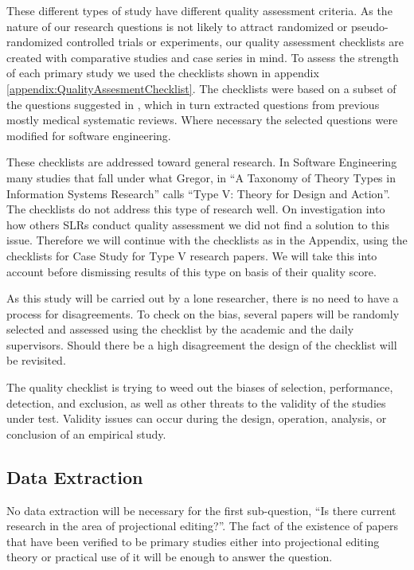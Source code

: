 These different types of study have different quality assessment criteria.  
As the nature of our research questions is not likely to attract randomized or pseudo-randomized controlled trials or experiments, our quality assessment checklists are created with comparative studies and case series in mind.
To assess the strength of each primary study we used the checklists shown in appendix \ref{appendix:QualityAssesmentChecklist}.
The checklists were based on a subset of the questions suggested in \cite{keele2007guidelines}, which in turn extracted questions from previous mostly medical systematic reviews.
Where necessary the selected questions were modified for software engineering.

These checklists are addressed toward general research.
In Software Engineering many studies that fall under what Gregor\cite{gregor2006nature}, in ``A Taxonomy of Theory Types in Information Systems Research'' calls ``Type V: Theory for Design and Action''.
The checklists do not address this type of research well.
On investigation into how others SLRs conduct quality assessment we did not find a solution to this issue. 
Therefore we will continue with the checklists as in the Appendix, using the checklists for Case Study for Type V research papers.
We will take this into account before dismissing results of this type on basis of their quality score.

As this study will be carried out by a lone researcher, there is no need to have a process for disagreements.
To check on the bias, several papers will be randomly selected and assessed using the checklist by the academic and the daily supervisors.
Should there be a high disagreement the design of the checklist will be revisited.

The quality checklist is trying to weed out the biases of selection, performance, detection, and exclusion, as well as other threats to the validity of the studies under test.
Validity issues can occur during the design, operation, analysis, or conclusion of an empirical study.

\subsection{Data Extraction}
No data extraction will be necessary for the first sub-question,  ``Is there current research in the area of projectional editing?''.
The fact of the existence of papers that have been verified to be primary studies either into projectional editing theory or practical use of it will be enough to answer the question.

